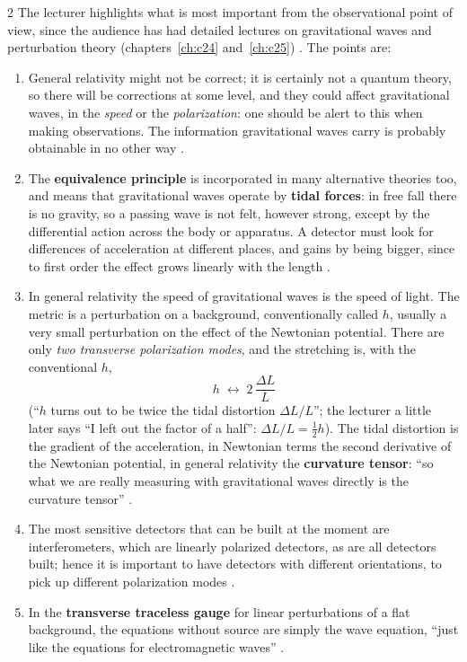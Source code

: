 \begin{paracol}{2}
The lecturer highlights what is most important from the observational point of view, since the audience has had detailed lectures on gravitational waves and perturbation theory (chapters~\ref{ch:c24} and~\ref{ch:c25}) . The points are:
\begin{enumerate}
  \item General relativity might not be correct; it is certainly not a quantum theory, so there will be corrections at some level, and they could affect gravitational waves, in the \emph{speed} or the \emph{polarization}: one should be alert to this when making observations. The information gravitational waves carry is probably obtainable in no other way .
  \item The \textbf{equivalence principle} is incorporated in many alternative theories too, and means that gravitational waves operate by \textbf{tidal forces}: in free fall there is no gravity, so a passing wave is not felt, however strong, except by the differential action across the body or apparatus. A detector must look for differences of acceleration at different places, and gains by being bigger, since to first order the effect grows linearly with the length .
  \item In general relativity the speed of gravitational waves is the speed of light. The metric is a perturbation on a background, conventionally called $h$, usually a very small perturbation on the effect of the Newtonian potential. There are only \emph{two transverse polarization modes}, and the stretching is, with the conventional $h$,
  \[
    h\;\leftrightarrow\;2\,\frac{\Delta L}{L}
  \]
  (``$h$ turns out to be twice the tidal distortion $\Delta L/L$''; the lecturer a little later says ``I left out the factor of a half'': $\Delta L/L=\tfrac12 h$). The tidal distortion is the gradient of the acceleration, in Newtonian terms the second derivative of the Newtonian potential, in general relativity the \textbf{curvature tensor}: ``so what we are really measuring with gravitational waves directly is the curvature tensor'' .
  \item The most sensitive detectors that can be built at the moment are interferometers, which are linearly polarized detectors, as are all detectors built; hence it is important to have detectors with different orientations, to pick up different polarization modes .
  \item In the \textbf{transverse traceless gauge} for linear perturbations of a flat background, the equations without source are simply the wave equation, ``just like the equations for electromagnetic waves'' .
\end{enumerate}


\end{paracol}
